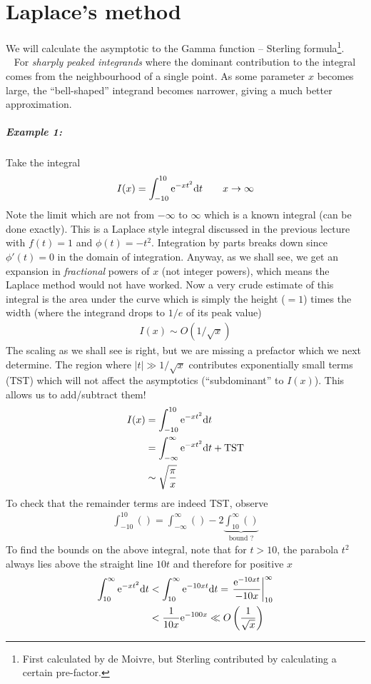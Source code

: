 \chapter{Laplace's method}
We will calculate the asymptotic to the Gamma function -- Sterling formula\footnote{First calculated by de Moivre, but Sterling contributed by calculating a certain pre-factor.}.\\
\ \newline 
For \emph{sharply peaked integrands} where the dominant contribution to the integral comes from the neighbourhood of a single point. As some parameter $x$ becomes large, the ``bell-shaped'' integrand becomes narrower, giving a much better approximation.

\paragraph{Example 1:} Take the integral
\begin{align*}
	I(x) = \int_{-10}^{10} \mathrm{e}^{-xt^2} \mathrm{d} t \qquad x \rightarrow \infty
\end{align*}
Note the limit which are not from $-\infty$ to $\infty$ which is a known integral (can be done exactly).  This is a Laplace style integral discussed in the previous lecture with $f(t)=1$ and $\phi(t) = -t^2$. Integration by parts breaks down since $\phi'(t)=0$ in the domain of integration. Anyway, as we shall see, we get an expansion in \emph{fractional} powers of $x$ (not integer powers), which means the Laplace method would not have worked. Now a very crude estimate of this integral is the area under the curve which is simply the height ($=1$) times the width (where the integrand drops to $1/e$ of its peak value)
\begin{align*}
	I(x) \sim O\left({1}/{\sqrt{x}}\right)
\end{align*}
The scaling as we shall see is right, but we are missing a prefactor which we next determine. The region where $ |t| \gg 1/\sqrt{x} $ contributes exponentially small terms (TST) which will not affect the asymptotics (``subdominant'' to $I(x)$). This allows us to add/subtract them!
\begin{align*}
	I(x) &= \int_{-10}^{10} \mathrm{e}^{-xt^2} \mathrm{d} t \\
	&= \int_{-\infty}^{\infty} \mathrm{e}^{-xt^2} \mathrm{d} t + \mathrm{TST} \\
	& \sim \sqrt{\frac{\pi}{x}}
\end{align*} 
To check that the remainder terms are indeed TST, observe
\begin{align*}
	\int_{-10}^{10}() = \int_{-\infty}^{\infty}() - 2 \underbrace{\int_{10}^{\infty} ()}_{\text{bound ?}}
\end{align*}
To find the bounds on the above integral, note that for $t > 10$, the parabola $t^2$ always lies above the straight line $10t$ and therefore for positive $x$
\begin{align*}
	\int_{10}^{\infty}\mathrm{e}^{-xt^2} \mathrm{d} t &< \int_{10}^{\infty}\mathrm{e}^{-10xt} \mathrm{d} t = \left. \frac{\mathrm{e}^{-10xt}}{-10x}\right|^\infty_{10} \\
	&< \frac{1}{10x} \mathrm{e}^{-100x} \ll O\left(\frac{1}{\sqrt{x}}\right)
\end{align*}

